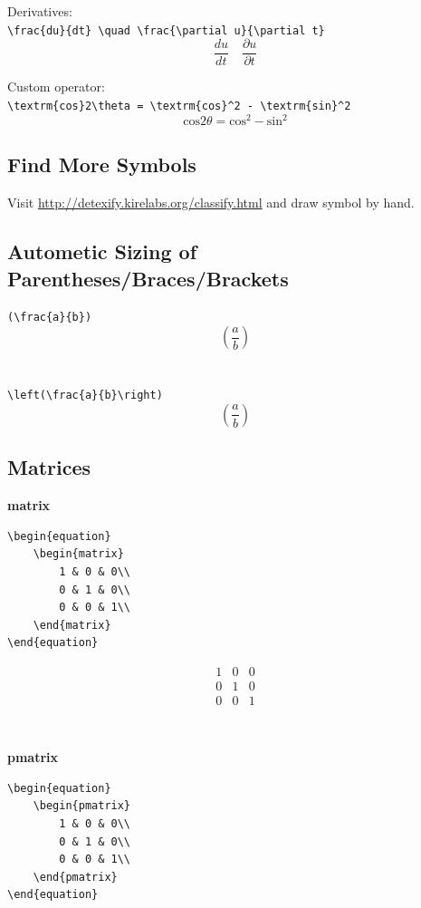 \documentclass{article}
\begin{document}
Derivatives:\\
\verb|\frac{du}{dt} \quad \frac{\partial u}{\partial t}|\\
$$\frac{du}{dt} \quad \frac{\partial u}{\partial t}$$

Custom operator:\\
\verb|\textrm{cos}2\theta = \textrm{cos}^2 - \textrm{sin}^2|\\
$$\textrm{cos}2\theta = \textrm{cos}^2 - \textrm{sin}^2$$

\subsection{Find More Symbols}

Visit \url{http://detexify.kirelabs.org/classify.html} and draw symbol by hand.

\subsection{Autometic Sizing of Parentheses/Braces/Brackets}

\verb|(\frac{a}{b})|\\
$$ (\frac{a}{b}) $$
\\~\\
\verb|\left(\frac{a}{b}\right)|
$$ \left(\frac{a}{b}\right) $$


\subsection{Matrices}

\textbf{matrix}
\begin{verbatim}
\begin{equation}
	\begin{matrix}
		1 & 0 & 0\\
		0 & 1 & 0\\
		0 & 0 & 1\\
	\end{matrix}
\end{equation}
\end{verbatim}

\begin{equation}
	\begin{matrix}
		1 & 0 & 0\\
		0 & 1 & 0\\
		0 & 0 & 1\\
	\end{matrix}
\end{equation}
\\~\\
\textbf{pmatrix}
\begin{verbatim}
\begin{equation}
	\begin{pmatrix}
		1 & 0 & 0\\
		0 & 1 & 0\\
		0 & 0 & 1\\
	\end{pmatrix}
\end{equation}
\end{verbatim}
\end{document}
